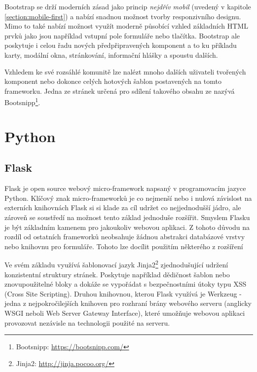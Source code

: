 Bootstrap se drží moderních zásad jako princip \emph{nejdřív mobil} (uvedený v kapitole \ref{section:mobile-first}) a nabízí snadnou možnost tvorby responzivního designu. Mimo to také nabízí možnost využít moderně působící vzhled základních HTML prvků jako jsou například vstupní pole formuláře nebo tlačítka. Bootstrap ale poskytuje i celou řadu nových předpřipravených komponent a to ku příkladu karty, modální okna, stránkování, informační hlášky a spoustu dalších.

Vzhledem ke své rozsáhlé komunitě lze nalézt mnoho dalších uživateli tvořených komponent nebo dokonce celých hotových šablon postavených na tomto frameworku. Jedna ze stránek určená pro sdílení takového obsahu ze nazývá Bootsnipp\footnote{Bootsnipp: \url{https://bootsnipp.com/}}.

\blindtext[2]



\section{Python}
\blindtext[2]

\subsection{Flask}
Flask je open source webový micro-framework napsaný v programovacím jazyce Python. Klíčový znak micro-frameworků je co nejmenší nebo i nulová závislost na externích knihovnách %
Flask si si klade za cíl udržet co nejjednodušší jádro, ale zároveň se soustředí na možnost tento základ jednoduše rozšířit.
Smyslem Flasku je být základním kamenem pro jakoukoliv webovou aplikaci. Z tohoto důvodu na rozdíl od ostatních frameworků neobsahuje žádnou abstrakci databázové vrstvy nebo knihovnu pro formuláře. Tohoto lze docílit použitím některého z rozšíření %

Ve svém základu využívá šablonovací jazyk Jinja2\footnote{Jinja2: \url{http://jinja.pocoo.org/}} zjednodušující udržení konzistentní struktury stránek. Poskytuje například dědičnost šablon nebo znovupoužitelné bloky a dokáže se vypořádat s bezpečnostními útoky typu XSS (Cross Site Scripting). %
Druhou knihovnou, kterou Flask využívá je Werkzeug - jedna z nejpokročilejších knihoven pro rozhraní brány webového serveru (anglicky WSGI neboli Web Server Gateway Interface), které umožňuje webovou aplikaci provozovat nezávisle na technologii použité na serveru. %

